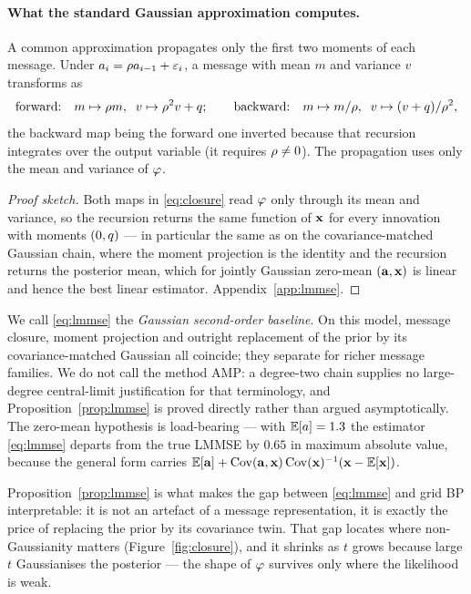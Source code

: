 \documentclass{article}
\begin{document}
\paragraph{What the standard Gaussian approximation computes.} A common approximation propagates
only the first two moments of each message. Under $a_i = \rho a_{i-1} + \varepsilon_i$, a message
with mean $m$ and variance $v$ transforms as
\begin{equation}
\label{eq:closure}
\text{forward:}\quad m \mapsto \rho m,\;\; v \mapsto \rho^2 v + q ;
\qquad
\text{backward:}\quad m \mapsto m/\rho,\;\; v \mapsto (v+q)/\rho^2 ,
\end{equation}
the backward map being the forward one inverted because that recursion integrates over the output
variable (it requires $\rho\neq0$). The propagation uses only the mean and variance of $\varphi$.



\begin{proof}[Proof sketch]
Both maps in \eqref{eq:closure} read $\varphi$ only through its mean and variance, so the recursion
returns the same function of $\mathbf{x}$ for every innovation with moments $(0,q)$ --- in particular
the same as on the covariance-matched Gaussian chain, where the moment projection is the identity
and the recursion returns the posterior mean, which for jointly Gaussian zero-mean $(\mathbf{a},\mathbf{x})$ is
linear and hence the best linear estimator. Appendix~\ref{app:lmmse}.
\end{proof}

We call \eqref{eq:lmmse} the \emph{Gaussian second-order baseline}. On this model, message
closure, moment projection and outright replacement of the prior by its covariance-matched
Gaussian all coincide; they separate for richer message families. We do not call the method AMP: a
degree-two chain supplies no large-degree central-limit justification for that terminology, and
Proposition~\ref{prop:lmmse} is proved directly rather than argued asymptotically. The zero-mean
hypothesis is load-bearing --- with $\mathbb{E}[a]=1.3$ the estimator \eqref{eq:lmmse} departs from the
true LMMSE by $0.65$ in maximum absolute value, because the general form carries
$\mathbb{E}[\mathbf{a}] + \operatorname{Cov}(\mathbf{a},\mathbf{x})\operatorname{Cov}(\mathbf{x})^{-1}(\mathbf{x}-\mathbb{E}[\mathbf{x}])$.

Proposition~\ref{prop:lmmse} is what makes the gap between \eqref{eq:lmmse} and grid BP
interpretable: it is not an artefact of a message representation, it is exactly the price of
replacing the prior by its covariance twin. That gap locates where non-Gaussianity matters
(Figure~\ref{fig:closure}), and it shrinks as $t$ grows because large $t$ Gaussianises the
posterior --- the shape of $\varphi$ survives only where the likelihood is weak.
\end{document}
